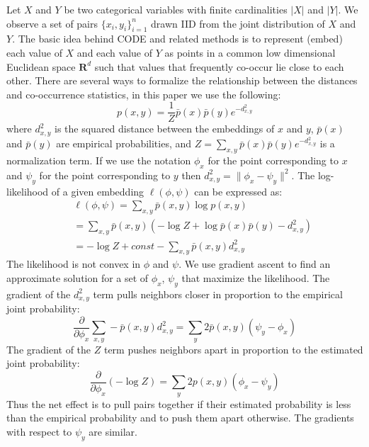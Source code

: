 \documentclass[11pt]{article}
\begin{document}
Let $X$ and $Y$ be two categorical variables with finite cardinalities
$|X|$ and $|Y|$.  We observe a set of pairs $\{x_i, y_i\}_{i=1}^n$
drawn IID from the joint distribution of $X$ and $Y$.  The basic idea
behind CODE and related methods is to represent (embed) each value of
$X$ and each value of $Y$ as points in a common low dimensional
Euclidean space $\mathbf{R}^d$ such that values that frequently
co-occur lie close to each other.  There are several ways to formalize
the relationship between the distances and co-occurrence statistics, in
this paper we use the following:
\begin{equation} \label{eq:probability}
p(x,y) = \frac{1}{Z} \bar{p}(x) \bar{p}(y) e^{-d^2_{x,y}}
\end{equation}
\noindent where $d^2_{x,y}$ is the squared distance between the
embeddings of $x$ and $y$, $\bar{p}(x)$ and $\bar{p}(y)$ are empirical
probabilities, and $Z=\sum_{x,y} \bar{p}(x) \bar{p}(y) e^{-d^2_{x,y}}$ is
a normalization term.  If we use the notation $\phi_x$ for the
point corresponding to $x$ and $\psi_y$ for the point corresponding
to $y$ then $d^2_{x,y} = \|\phi_x-\psi_y\|^2$.  The log-likelihood
of a given embedding $\ell(\phi, \psi)$ can be expressed as:
\begin{eqnarray} 
&&\ell(\phi, \psi) = \sum_{x,y} \bar{p}(x,y) \log p(x,y) \label{eq:likelihood} \\
&&= \sum_{x,y} \bar{p}(x,y) (-\log Z + \log \bar{p}(x)\bar{p}(y) - d^2_{x,y}) \nonumber \\
&&= -\log Z + \mathit{const} - \sum_{x,y} \bar{p}(x,y) d^2_{x,y} \nonumber
\end{eqnarray}
The likelihood is not convex in $\phi$ and $\psi$.  We use gradient
ascent to find an approximate solution for a set of $\phi_x$, $\psi_y$
that maximize the likelihood.  The gradient of the $d^2_{x,y}$ term
pulls neighbors closer in proportion to the empirical joint
probability:
\begin{equation}
\frac{\partial}{\partial\phi_x} \sum_{x,y} -\bar{p}(x,y) d^2_{x,y} =
\sum_y 2 \bar{p}(x,y) (\psi_y - \phi_x) \label{eq:attract}
\end{equation}
The gradient of the $Z$ term pushes neighbors apart in proportion to the
estimated joint probability:
\begin{equation}
\frac{\partial}{\partial\phi_x} (-\log Z) = \sum_y 2 p(x,y) (\phi_x -
\psi_y) \label{eq:repulse}
\end{equation}
Thus the net effect is to pull pairs together if their estimated
probability is less than the empirical probability and to push them
apart otherwise.  The gradients with respect to $\psi_y$ are
similar.
\end{document}
